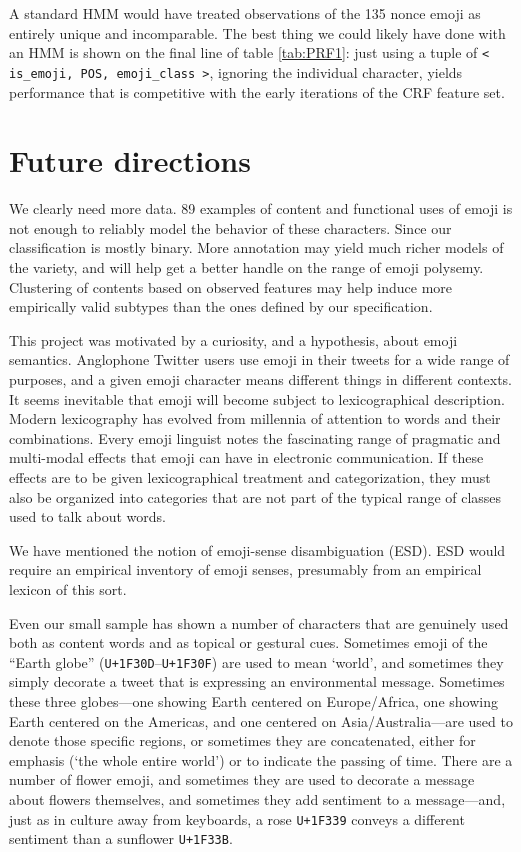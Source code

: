 \documentclass[11pt]{article}
\begin{document}
A standard HMM would have treated observations of the 135 nonce emoji as entirely unique and incomparable. The best thing we could likely have done with an HMM is shown on the final line of table \ref{tab:PRF1}: just using a tuple of \texttt{< is\_emoji, POS, emoji\_class >}, ignoring the individual character, yields performance that is competitive with the early iterations of the CRF feature set.


\section{Future directions}

We clearly need more data. 89 examples of content and functional uses of emoji is not enough to reliably model the behavior of these characters. Since our
classification is mostly binary. More annotation may yield much richer models of the variety, and will help get a better handle on the range of emoji polysemy.
Clustering of contents based on observed features may help induce more empirically valid subtypes than the ones defined by our specification.

This project was motivated by a curiosity, and a hypothesis, about emoji semantics. Anglophone Twitter users use emoji in their tweets
for a wide range of purposes, and a given emoji character means different things in different contexts. It seems inevitable that emoji will
become subject to lexicographical description. Modern lexicography has evolved from millennia of attention to words and their combinations.
Every emoji linguist notes the fascinating range of pragmatic and multi-modal effects that emoji can have in electronic communication. If
these effects are to be given lexicographical treatment and categorization, they must also be organized into categories that are not part of
the typical range of classes used to talk about words.



We have mentioned the notion of emoji-sense disambiguation (ESD). ESD would require an empirical inventory of emoji senses, presumably
from an empirical lexicon of this sort. 

Even our small sample has shown a number of characters that are genuinely used both as content words
and as topical or gestural cues. Sometimes emoji of the ``Earth globe'' (\texttt{U+1F30D}--\texttt{U+1F30F}) are used to mean `world', 
and sometimes they simply decorate a tweet that is expressing an environmental message. Sometimes these three globes---one showing Earth centered
on Europe/Africa, one showing Earth centered on the Americas, and one centered on Asia/Australia---are used to denote those specific regions, 
or sometimes they are concatenated, either for emphasis (`the whole entire world') or to indicate the passing of time. There are a number of flower emoji, and sometimes they are used to decorate a message about flowers themselves, and sometimes they add sentiment to a message---and, just as in culture away from keyboards, a rose \texttt{U+1F339} conveys a different sentiment than a sunflower \texttt{U+1F33B}.




\end{document}
